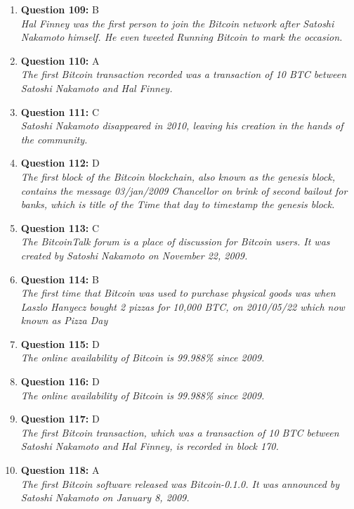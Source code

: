 \documentclass[12pt,a4paper]{article}
\begin{document}
\begin{enumerate}
\item \textbf{Question 109:} B
\\ \textit{Hal Finney was the first person to join the Bitcoin network after Satoshi Nakamoto himself. He even tweeted Running Bitcoin to mark the occasion.}

\item \textbf{Question 110:} A
\\ \textit{The first Bitcoin transaction recorded was a transaction of 10 BTC between Satoshi Nakamoto and Hal Finney.}

\item \textbf{Question 111:} C
\\ \textit{Satoshi Nakamoto disappeared in 2010, leaving his creation in the hands of the community.}

\item \textbf{Question 112:} D
\\ \textit{The first block of the Bitcoin blockchain, also known as the genesis block, contains the message 03/jan/2009 Chancellor on brink of second bailout for banks, which is title of the Time that day to timestamp the genesis block.}

\item \textbf{Question 113:} C
\\ \textit{The BitcoinTalk forum is a place of discussion for Bitcoin users. It was created by Satoshi Nakamoto on November 22, 2009.}

\item \textbf{Question 114:} B
\\ \textit{The first time that Bitcoin was used to purchase physical goods was when Laszlo Hanyecz bought 2 pizzas for 10,000 BTC, on 2010/05/22 which now known as Pizza Day}

\item \textbf{Question 115:} D
\\ \textit{The online availability of Bitcoin is 99.988\% since 2009.}

\item \textbf{Question 116:} D
\\ \textit{The online availability of Bitcoin is 99.988\% since 2009.}

\item \textbf{Question 117:} D
\\ \textit{The first Bitcoin transaction, which was a transaction of 10 BTC between Satoshi Nakamoto and Hal Finney, is recorded in block 170.}

\item \textbf{Question 118:} A
\\ \textit{The first Bitcoin software released was Bitcoin-0.1.0. It was announced by Satoshi Nakamoto on January 8, 2009.}


\end{enumerate}
\end{document}
